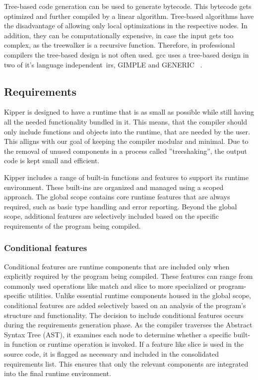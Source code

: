 Tree-based code generation can be used to generate bytecode. This bytecode gets optimized and further compiled by a linear algorithm. Tree-based algorithms have the disadvantage of allowing only local optimizations in the respective nodes. In addition, they can be computationally expensive, in case the input gets too complex, as the treewalker is a recursive function. Therefore, in professional compilers the tree-based design is not often used. \acrshort{gcc} uses a tree-based design in two of it's language independent~\acrshort{ir}s, GIMPLE and GENERIC ~\cite{gcc:gimpletuples}.

\subsection{Requirements}
\label{sec:requirements}
Kipper is designed to have a runtime that is as small as possible while still having all the needed functionality bundled in it. This means, that the compiler should only include functions and objects into the runtime, that are needed by the user. This alligns with our goal of keeping the compiler modular and minimal. Due to the removal of unused components in a process called ''treeshaking'', the output code is kept small and efficient.

Kipper includes a range of built-in functions and features to support its runtime environment. These built-ins are organized and managed using a scoped approach. The global scope contains core runtime features that are always required, such as basic type handling and error reporting. Beyond the global scope, additional features are selectively included based on the specific requirements of the program being compiled.

\subsubsection{Conditional features}
Conditional features are runtime components that are included only when explicitly required by the program being compiled. These features can range from commonly used operations like match and slice to more specialized or program-specific utilities. Unlike essential runtime components housed in the global scope, conditional features are added selectively based on an analysis of the program's structure and functionality. The decision to include conditional features occurs during the requirements generation phase. As the compiler traverses the Abstract Syntax Tree (AST), it examines each node to determine whether a specific built-in function or runtime operation is invoked. If a feature like slice is used in the source code, it is flagged as necessary and included in the consolidated requirements list. This ensures that only the relevant components are integrated into the final runtime environment.

